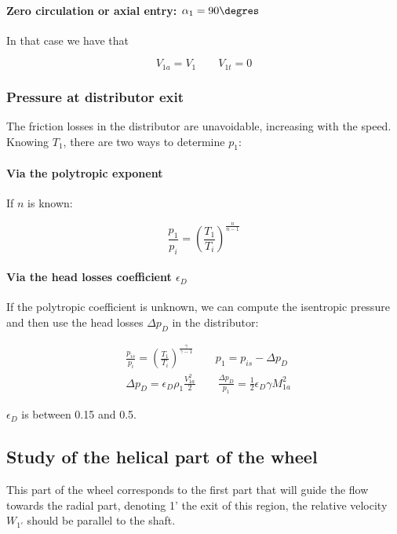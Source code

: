 \paragraph{Zero circulation or axial entry: $\alpha _1 = 90\degres$}
In that case we have that 

\begin{equation}
V_{1a} = V_1 \qquad V_{1t}= 0
\end{equation}

\subsubsection{Pressure at distributor exit}
The friction losses in the distributor are unavoidable, increasing with the speed. Knowing $T_1$, there are two ways to determine $p_1$: 

\paragraph{Via the polytropic exponent} 
If $n$ is known: 

\begin{equation}
\frac{p_1}{p_i} = \left(\frac{T_1}{T_i} \right)^{\frac{n}{n-1}}
\end{equation}

\paragraph{Via the head losses coefficient $\epsilon _D$}
If the polytropic coefficient is unknown, we can compute the isentropic pressure and then use the head losses $\Delta p_D$ in the distributor: 

\begin{equation}
\begin{aligned}
&\frac{p_{is}}{p_i} = \left(\frac{T_1}{T_i} \right)^{\frac{\gamma}{\gamma-1}} \qquad p_1 = p_{is} - \Delta p_D\\
&\Delta p_D = \epsilon _D \rho _1 \frac{V_{1a}^2}{2} \qquad \frac{\Delta p_D}{p_1} = \frac{1}{2} \epsilon _D \gamma M_{1a}^2
\end{aligned}
\end{equation}

$\epsilon_D$ is between 0.15 and 0.5.

\subsection{Study of the helical part of the wheel}
This part of the wheel corresponds to the first part that will guide the flow towards the radial part, denoting 1' the exit of this region, the relative velocity $W_{1'}$ should be parallel to the shaft.

